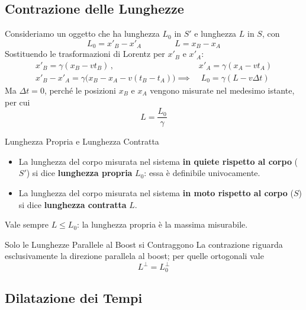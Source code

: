 \subsection{Contrazione delle Lunghezze}

Consideriamo un oggetto che ha lunghezza $L_0$ in $S'$ e lunghezza $L$ in $S$, con
\begin{equation*}
    L_0 = x'_B - x'_A
    \qquad\qquad
    L = x_B - x_A
\end{equation*}
Sostituendo le trasformazioni di Lorentz per $x'_B$ e $x'_A$:
\begin{align*}
    x'_B = \gamma(x_B - vt_B) \, , \qquad & x'_A = \gamma(x_A - vt_A) \\
    x'_B - x'_A = \gamma\big(x_B - x_A - v(t_B - t_A)\big) \implies & \; L_0 = \gamma\left(L - v\Delta t\right)
\end{align*}
Ma $\Delta t = 0$, perché le posizioni $x_B$ e $x_A$ vengono misurate nel medesimo istante, per cui
\begin{equation}
    \boxed{\;L = \frac{L_0}{\gamma}\;}
\end{equation}

\begin{definizione}{Lunghezza Propria e Lunghezza Contratta}
\begin{itemize}[leftmargin=1.4em]
    \item La lunghezza del corpo misurata nel sistema \textbf{in quiete rispetto al corpo} ($S'$) si dice \textbf{lunghezza propria} $L_0$: essa è definibile univocamente.
    \item La lunghezza del corpo misurata nel sistema \textbf{in moto rispetto al corpo} ($S$) si dice \textbf{lunghezza contratta} $L$.
\end{itemize}
Vale sempre $L \leq L_0$: la lunghezza propria è la massima misurabile.
\end{definizione}

\begin{attenzione}{Solo le Lunghezze Parallele al Boost si Contraggono}
La contrazione riguarda esclusivamente la direzione parallela al boost; per quelle ortogonali vale
\begin{equation*}
    L^{\perp} = L_0^{\perp}
\end{equation*}
\end{attenzione}

\subsection{Dilatazione dei Tempi}

